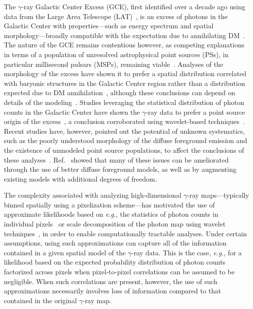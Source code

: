 \documentclass[prd,aps,10pt,nofootinbib,twocolumn,superscriptaddress,preprintnumbers,balancelastpage,longbibliography,floatfix]{revtex4-2}
\begin{document}
The \Fermi $\gamma$-ray Galactic Center Excess (GCE), first identified over a decade ago using data from the \Fermi Large Area Telescope (LAT)~\cite{Atwood:2009ez}, is an excess of photons in the Galactic Center with properties---such as energy spectrum and spatial morphology---broadly compatible with the expectation due to annihilating DM~\cite{Goodenough:2009gk,Hooper:2010mq,Boyarsky:2010dr,Hooper:2011ti,Abazajian:2012pn,Hooper:2013rwa,Gordon:2013vta,Abazajian:2014fta,Daylan:2014rsa,Calore:2014xka,Abazajian:2014hsa,Fermi-LAT:2015sau,Linden:2016rcf,Macias:2016nev,Clark:2016mbb}. The nature of the GCE remains contentious however, as competing explanations in terms of a population of unresolved astrophysical point sources (PSs), in particular millisecond pulsars (MSPs), remaining viable~\cite{Abazajian:2014fta,Abazajian:2010zy,Hooper:2013nhl,Calore:2014oga,Cholis:2014lta,Petrovic:2014xra,Yuan:2014yda,Brandt:2015ula,Gautam:2021wqn,Ploeg:2020jeh}. Analyses of the morphology of the excess have shown it to prefer a spatial distribution correlated with baryonic structures in the Galactic Center region rather than a distribution expected due to DM annihilation~\cite{Macias:2016nev,Macias:2019omb,Bartels:2017vsx}, although these conclusions can depend on details of the modeling~\cite{DiMauro:2020rcr,DiMauro:2021raz}. Studies leveraging the statistical distribution of photon counts in the Galactic Center have shown the $\gamma$-ray data to prefer a point source origin of the excess~\cite{Lee:2015fea,Bartels:2015aea,Buschmann:2020adf,Chang:2019ars}, a conclusion corroborated using wavelet-based techniques~\cite{Bartels:2015aea}. Recent studies have, however, pointed out the potential of unknown systematics, such as the poorly understood morphology of the diffuse foreground emission and the existence of unmodeled point source populations, to affect the conclusions of these analyses~\cite{Leane:2019xiy}. Ref.~\cite{Buschmann:2020adf} showed that many of these issues can be ameliorated through the use of better diffuse foreground models, as well as by augmenting existing models with additional degrees of freedom.

The complexity associated with analyzing high-dimensional $\gamma$-ray maps---typically binned spatially using a pixelization scheme---has motivated the use of approximate likelihoods based on \emph{e.g.}, the statistics of photon counts in individual pixels~\cite{Malyshev:2011zi,Lee:2014mza,Lee:2015fea} or scale decomposition of the photon map using wavelet techniques~\cite{Bartels:2015aea,Balaji:2018rwz,McDermott:2015ydv,Zhong:2019ycb}, in order to enable computationally tractable analyses. Under certain assumptions, using such approximations can capture all of the information contained in a given spatial model of the $\gamma$-ray data. This is the case, \emph{e.g.}, for a likelihood based on the expected probability distribution of photon counts factorized across pixels when pixel-to-pixel correlations can be assumed to be negligible. When such correlations are present, however, the use of such approximations necessarily involves loss of information compared to that contained in the original $\gamma$-ray map.
\end{document}
